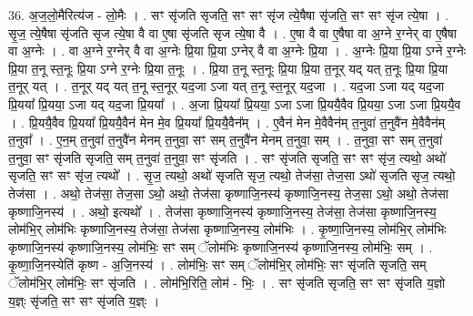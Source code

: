\documentclass[17pt]{extarticle}
\begin{document}
36. अ॒ज॒लो॒मैरित्य॑ज - लो॒मैः । . सꣳ सृ॑जति सृजति॒ सꣳ सꣳ सृ॑ज त्ये॒षैषा सृ॑जति॒ सꣳ सꣳ सृ॑ज त्ये॒षा । . सृ॒ज॒ त्ये॒षैषा सृ॑जति सृज त्ये॒षा वै वा ए॒षा सृ॑जति सृज त्ये॒षा वै । . ए॒षा वै वा ए॒षैषा वा अ॒ग्ने र॒ग्नेर् वा ए॒षैषा वा अ॒ग्नेः । . वा अ॒ग्ने र॒ग्नेर् वै वा अ॒ग्नेः प्रि॒या प्रि॒या ऽग्नेर् वै वा अ॒ग्नेः प्रि॒या । . अ॒ग्नेः प्रि॒या प्रि॒या ऽग्ने र॒ग्नेः प्रि॒या त॒नू स्त॒नूः प्रि॒या ऽग्ने र॒ग्नेः प्रि॒या त॒नूः । . प्रि॒या त॒नू स्त॒नूः प्रि॒या प्रि॒या त॒नूर् यद् यत् त॒नूः प्रि॒या प्रि॒या त॒नूर् यत् । . त॒नूर् यद् यत् त॒नू स्त॒नूर् यद॒जा ऽजा यत् त॒नू स्त॒नूर् यद॒जा । . यद॒जा ऽजा यद् यद॒जा प्रि॒यया᳚ प्रि॒यया॒ ऽजा यद् यद॒जा प्रि॒यया᳚ । . अ॒जा प्रि॒यया᳚ प्रि॒यया॒ ऽजा ऽजा प्रि॒ययै॒वैव प्रि॒यया॒ ऽजा ऽजा प्रि॒ययै॒व । . प्रि॒ययै॒वैव प्रि॒यया᳚ प्रि॒ययै॒वैन॑ मेन मे॒व प्रि॒यया᳚ प्रि॒ययै॒वैन᳚म् । . ए॒वैन॑ मेन मे॒वैवैन॑म् त॒नुवा॑ त॒नुवै॑न मे॒वैवैन॑म् त॒नुवा᳚ । . ए॒न॒म् त॒नुवा॑ त॒नुवै॑न मेनम् त॒नुवा॒ सꣳ सम् त॒नुवै॑न मेनम् त॒नुवा॒ सम् । . त॒नुवा॒ सꣳ सम् त॒नुवा॑ त॒नुवा॒ सꣳ सृ॑जति सृजति॒ सम् त॒नुवा॑ त॒नुवा॒ सꣳ सृ॑जति । . सꣳ सृ॑जति सृजति॒ सꣳ सꣳ सृ॑ज॒ त्यथो॒ अथो॑ सृजति॒ सꣳ सꣳ सृ॑ज॒ त्यथो᳚ । . सृ॒ज॒ त्यथो॒ अथो॑ सृजति सृज॒ त्यथो॒ तेज॑सा॒ तेज॒सा ऽथो॑ सृजति सृज॒ त्यथो॒ तेज॑सा । . अथो॒ तेज॑सा॒ तेज॒सा ऽथो॒ अथो॒ तेज॑सा कृष्णाजि॒नस्य॑ कृष्णाजि॒नस्य॒ तेज॒सा ऽथो॒ अथो॒ तेज॑सा कृष्णाजि॒नस्य॑ । . अथो॒ इत्यथो᳚ । . तेज॑सा कृष्णाजि॒नस्य॑ कृष्णाजि॒नस्य॒ तेज॑सा॒ तेज॑सा कृष्णाजि॒नस्य॒ लोम॑भि॒र् लोम॑भिः कृष्णाजि॒नस्य॒ तेज॑सा॒ तेज॑सा कृष्णाजि॒नस्य॒ लोम॑भिः । . कृ॒ष्णा॒जि॒नस्य॒ लोम॑भि॒र् लोम॑भिः कृष्णाजि॒नस्य॑ कृष्णाजि॒नस्य॒ लोम॑भिः॒ सꣳ सम् ॅलोम॑भिः कृष्णाजि॒नस्य॑ कृष्णाजि॒नस्य॒ लोम॑भिः॒ सम् । . कृ॒ष्णा॒जि॒नस्येति॑ कृष्ण - अ॒जि॒नस्य॑ । . लोम॑भिः॒ सꣳ सम् ॅलोम॑भि॒र् लोम॑भिः॒ सꣳ सृ॑जति सृजति॒ सम् ॅलोम॑भि॒र् लोम॑भिः॒ सꣳ सृ॑जति । . लोम॑भि॒रिति॒ लोम॑ - भिः॒ । . सꣳ सृ॑जति सृजति॒ सꣳ सꣳ सृ॑जति य॒ज्ञो य॒ज्ञ्ः सृ॑जति॒ सꣳ सꣳ सृ॑जति य॒ज्ञ्ः । \newline
\pagebreak
{}
\end{document}
